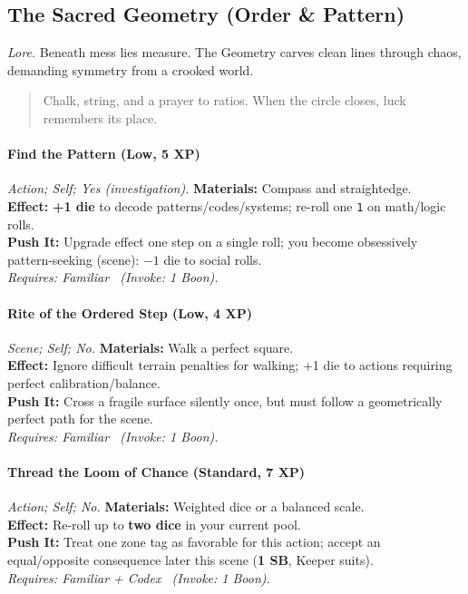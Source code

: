 \subsection{The Sacred Geometry (Order \& Pattern)}
\textit{Lore.} Beneath mess lies measure. The Geometry carves clean lines through chaos, demanding symmetry from a crooked world.

\begin{quote}
Chalk, string, and a prayer to ratios. When the circle closes, luck remembers its place.
\end{quote}

\paragraph{Find the Pattern (Low, 5 XP)} \emph{Action; Self; Yes (investigation).}
\textbf{Materials:} Compass and straightedge.\\
\textbf{Effect:} \textbf{+1 die} to decode patterns/codes/systems; re-roll one \texttt{1} on math/logic rolls.\\
\textbf{Push It:} Upgrade effect one step on a single roll; you become obsessively pattern-seeking (scene): \(-1\) die to social rolls.\\
\emph{Requires: Familiar \ (\textit{Invoke:} 1 Boon).}

\paragraph{Rite of the Ordered Step (Low, 4 XP)} \emph{Scene; Self; No.}
\textbf{Materials:} Walk a perfect square.\\
\textbf{Effect:} Ignore difficult terrain penalties for walking; +1 die to actions requiring perfect calibration/balance.\\
\textbf{Push It:} Cross a fragile surface silently once, but must follow a geometrically perfect path for the scene.\\
\emph{Requires: Familiar \ (\textit{Invoke:} 1 Boon).}

\paragraph{Thread the Loom of Chance (Standard, 7 XP)} \emph{Action; Self; No.}
\textbf{Materials:} Weighted dice or a balanced scale.\\
\textbf{Effect:} Re-roll up to \textbf{two dice} in your current pool.\\
\textbf{Push It:} Treat one zone tag as favorable for this action; accept an equal/opposite consequence later this scene (\textbf{1 SB}, Keeper suits).\\
\emph{Requires: Familiar + Codex \ (\textit{Invoke:} 1 Boon).}

